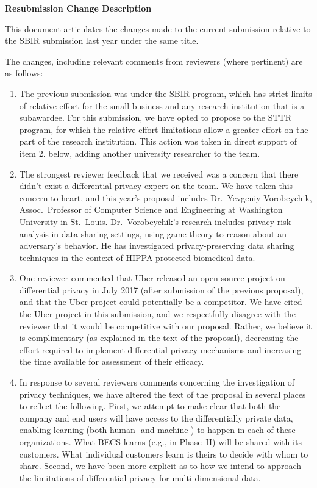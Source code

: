\documentclass[11pt]{article}
\begin{document}
\pagestyle{plain}
\thispagestyle{plain}

\begin{center}
\textbf{\Large Resubmission Change Description}
\end{center}

This document articulates the changes made to the current submission relative
to the SBIR submission last year under the same title.

The changes, including relevant comments from reviewers (where pertinent)
are as follows:

\begin{enumerate}

\item The previous submission was under the SBIR program, which has strict
limits of relative effort for the small business and any research institution
that is a subawardee.  For this submission, we have opted to propose to the
STTR program, for which the relative effort limitations allow a greater effort
on the part of the research institution.  This action was
taken in direct support of item 2. below, adding another university
researcher to the team.

\item The strongest reviewer feedback that we received was a concern that
there didn't exist a differential privacy expert on the team.  We have taken
this concern to heart, and this year's proposal includes Dr.~Yevgeniy
Vorobeychik, Assoc.~Professor of Computer Science and Engineering at
Washington University in St.~Louis.  Dr.~Vorobeychik's research includes
privacy risk analysis in data sharing settings, using game theory to
reason about an adversary's behavior.
He has investigated privacy-preserving data sharing techniques
in the context of HIPPA-protected biomedical data.

\item One reviewer commented that Uber released an open source project
on differential privacy in July 2017 (after submission of the previous
proposal), and that the Uber project could potentially be a competitor.
We have cited the Uber project in this submission, and we respectfully
disagree with the reviewer that it would be competitive with our proposal.
Rather, we believe it is complimentary (as explained in the text of the
proposal), decreasing the effort required to implement differential
privacy mechanisms and increasing the time available for assessment of
their efficacy.

\item In response to several reviewers comments concerning the investigation
of privacy techniques, we have altered the text of the proposal in several
places to reflect the following. First, we attempt to make clear that
both the company and end users will have access to the differentially
private data, enabling learning (both human- and machine-) to happen
in each of these organizations. What BECS learns (e.g., in Phase~II)
will be shared with its customers. What individual customers learn is
theirs to decide with whom to share.  Second, we have been more explicit
as to how we intend to approach the limitations of differential privacy
for multi-dimensional data.


\end{enumerate}
\end{document}
